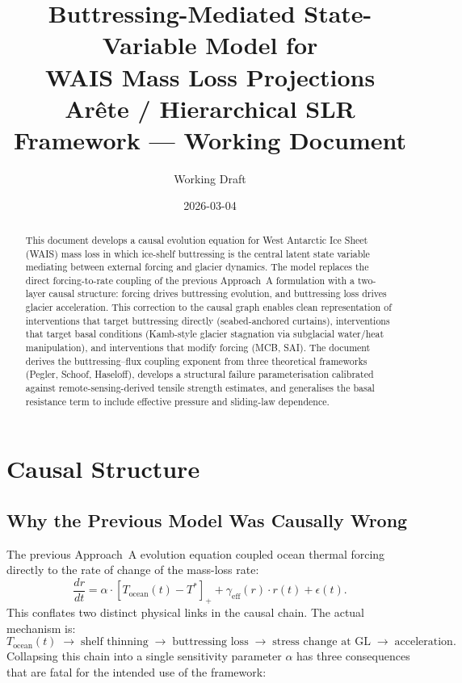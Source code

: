 \documentclass[11pt]{article}
\title{Buttressing-Mediated State-Variable Model for\\
  WAIS Mass Loss Projections\\[6pt]
  \large Ar\^{e}te / Hierarchical SLR Framework --- Working Document}
\author{Working Draft}
\date{2026-03-04}
\theoremstyle{definition}
\begin{document}
\maketitle

\begin{abstract}
This document develops a causal evolution equation for West Antarctic Ice Sheet (WAIS) mass loss in which ice-shelf buttressing is the central latent state variable mediating between external forcing and glacier dynamics.  The model replaces the direct forcing-to-rate coupling of the previous Approach~A formulation with a two-layer causal structure: forcing drives buttressing evolution, and buttressing loss drives glacier acceleration.  This correction to the causal graph enables clean representation of interventions that target buttressing directly (seabed-anchored curtains), interventions that target basal conditions (Kamb-style glacier stagnation via subglacial water/heat manipulation), and interventions that modify forcing (MCB, SAI).  The document derives the buttressing--flux coupling exponent from three theoretical frameworks (Pegler, Schoof, Haseloff), develops a structural failure parameterisation calibrated against remote-sensing-derived tensile strength estimates, and generalises the basal resistance term to include effective pressure and sliding-law dependence.
\end{abstract}

\tableofcontents
\newpage

\section{Causal Structure}
\label{sec:causal}

\subsection{Why the Previous Model Was Causally Wrong}

The previous Approach~A evolution equation coupled ocean thermal forcing directly to the rate of change of the mass-loss rate:
\begin{equation}
  \frac{dr}{dt} = \alpha \cdot [T_{\text{ocean}}(t) - T^{*}]_+ + \gamma_{\text{eff}}(r) \cdot r(t) + \epsilon(t).
  \label{eq:old_4A}
\end{equation}
This conflates two distinct physical links in the causal chain.  The actual mechanism is:
\begin{equation}
  T_{\text{ocean}}(t) \;\longrightarrow\; \text{shelf thinning} \;\longrightarrow\; \text{buttressing loss} \;\longrightarrow\; \text{stress change at GL} \;\longrightarrow\; \text{acceleration}.
  \label{eq:causal_chain}
\end{equation}
Collapsing this chain into a single sensitivity parameter $\alpha$ has three consequences that are fatal for the intended use of the framework:
\end{document}
